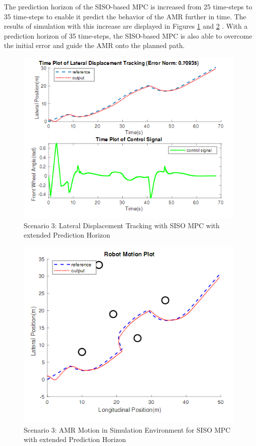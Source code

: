 \documentclass[a4paper, twocolumn]{article}
\begin{document}
The prediction horizon of the SISO-based MPC is increased from 25 time-steps to 35 time-steps to enable it predict the behavior of the AMR further in time. 
The results of simulation with this increase are displayed in Figures \ref{fig:scen_2_mpc1_lat_35} and \ref{fig:scen_2_mpc1_rob_mot_35} . 
With a prediction horizon of 35 time-steps, the SISO-based MPC is also able to overcome the initial error and guide the AMR onto the planned path. 

\begin{figure}[H]
    \centering
    \includegraphics[scale=0.40]{img/scenario_3/mpc1_35-lat_tracking.png}
    \caption{Scenario 3: Lateral Displacement Tracking with SISO MPC with extended Prediction Horizon}
    \label{fig:scen_2_mpc1_lat_35}
\end{figure}

\begin{figure}[H]
    \centering
    \includegraphics[scale=0.40]{img/scenario_3/mpc1_35-robot_motion.png}
    \caption{Scenario 3: AMR Motion in Simulation Environment for SISO MPC with extended Prediction Horizon}
    \label{fig:scen_2_mpc1_rob_mot_35}
\end{figure}
\end{document}
